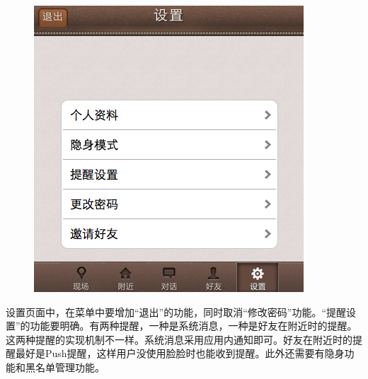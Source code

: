 \documentclass[cs4size]{ctexartutf8}
\begin{document}
\begin{figure}[H]
\centering
\includegraphics[scale=0.5]{./10.png}
\end{figure}

设置页面中，在菜单中要增加“退出”的功能，同时取消“修改密码”功能。“提醒设置”的功能要明确。有两种提醒，一种是系统消息，一种是好友在附近时的提醒。这两种提醒的实现机制不一样。系统消息采用应用内通知即可。好友在附近时的提醒最好是Push提醒，这样用户没使用脸脸时也能收到提醒。此外还需要有隐身功能和黑名单管理功能。



\newpage
\end{document}
